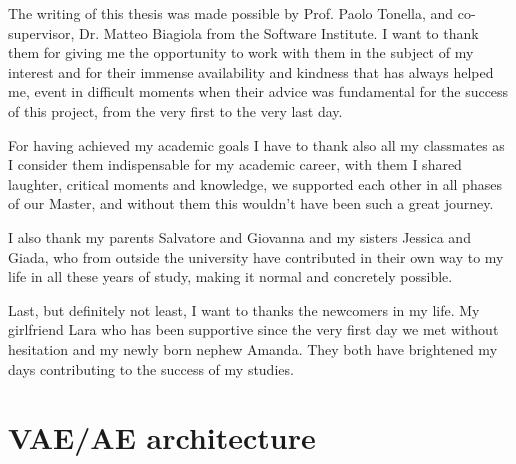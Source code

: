 \documentclass[mscthesis]{usiinfthesis}
\begin{document}
\begin{acknowledgements}
\vspace{\fill} 
The writing of this thesis was made possible by Prof. Paolo Tonella, and co-supervisor, Dr. Matteo Biagiola from the Software Institute. I want to thank them for giving me the opportunity to work with them in the subject of my interest and for their immense availability and kindness that has always helped me, event in difficult moments when their advice was fundamental for the success of this project, from the very first to the very last day. 

For having achieved my academic goals I have to thank also all my classmates as I consider them indispensable for my academic career, with them I shared laughter, critical moments and knowledge, we supported each other in all phases of our Master, and without them this wouldn't have been such a great journey.

I also thank my parents Salvatore and Giovanna and my sisters Jessica and Giada, who from outside the university have  contributed in their own way to my life in all these years of study, making it normal and concretely possible.

Last, but definitely not least, I want to thanks the newcomers in my life. My girlfriend Lara who has been supportive since the very first day we met without hesitation and my newly born nephew Amanda. They both have brightened my days contributing to the success of my studies.
\vspace{\fill} 
\end{acknowledgements}


\tableofcontents 
\listoffigures %
\listoftables %

\mainmatter









\appendix %

\chapter{VAE/AE architecture} \label{app:ae/vae}
\begin{center}
    \begin{minipage}{0.9\linewidth}
      
      \end{minipage}
\end{center}
\begin{center}
    \begin{minipage}{0.9\linewidth}
      
      \end{minipage}
\end{center}

\backmatter


%
%



\end{document}
